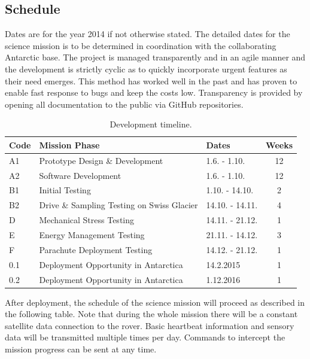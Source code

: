 \documentclass[a4paper,12pt]{article}
\begin{document}
\subsection{Schedule}

Dates are for the year 2014 if not otherwise stated. The detailed dates for the science mission is to be determined in coordination with the collaborating Antarctic base. The project is managed transparently and in an agile manner and the development is strictly cyclic as to quickly incorporate urgent features as their need emerges. This method has worked well in the past and has proven to enable fast response to bugs and keep the costs low. Transparency is provided by opening all documentation to the public via GitHub \cite{octanisgithub} repositories. 

\begin{table}[h!]
\centering
\begin{tabular}{ l | l | l | c }

\bfseries{Code} & \bfseries{Mission Phase} & \bfseries{Dates} & \bfseries{Weeks} \\
\hline
A1 & Prototype Design \& Development & 1.6. - 1.10. & 12 \\
A2 & Software Development & 1.6. - 1.10. & 12 \\
B1 & Initial Testing & 1.10. - 14.10. & 2  \\
B2 & Drive \& Sampling Testing on Swiss Glacier & 14.10. - 14.11. & 4 \\
D & Mechanical Stress Testing & 14.11. - 21.12. & 1 \\
E & Energy Management Testing & 21.11. - 14.12. & 3 \\
F & Parachute Deployment Testing & 14.12. - 21.12. & 1 \\
0.1 & Deployment Opportunity in Antarctica & 14.2.2015 &  1 \\
0.2 & Deployment Opportunity in Antarctica & 1.12.2016 &  1 \\

\end{tabular}
\caption{Development timeline.}
\end{table}

After deployment, the schedule of the science mission will proceed as described in the following table. Note that during the whole mission there will be a constant satellite data connection to the rover. Basic heartbeat information and sensory data will be transmitted multiple times per day. Commands to intercept the mission progress can be sent at any time.
\end{document}
